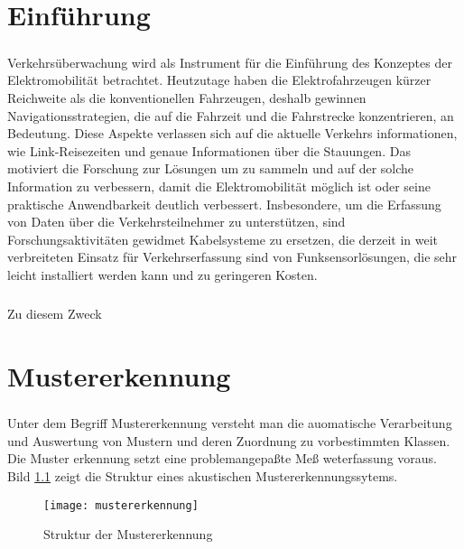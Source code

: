 \chapter*{Einf\"uhrung}

\paragraph{}
Verkehrs\"uberwachung wird als Instrument f\"ur die Einf\"uhrung des Konzeptes
der Elektromobilit\"at betrachtet. Heutzutage haben die Elektrofahrzeugen
k\"urzer Reichweite als die konventionellen Fahrzeugen, deshalb gewinnen
Navigationsstrategien, die auf die Fahrzeit und die Fahrstrecke konzentrieren,
an Bedeutung. Diese Aspekte verlassen sich auf die aktuelle Verkehrs%
informationen, wie Link-Reisezeiten und genaue Informationen \"uber die
Stauungen. Das motiviert die Forschung zur L\"osungen um zu sammeln und
auf der solche Information zu verbessern, damit die Elektromobilit\"at m\"oglich
ist oder seine praktische Anwendbarkeit deutlich verbessert. Insbesondere, um
die Erfassung von Daten \"uber die Verkehrsteilnehmer zu unterst\"utzen, sind
Forschungsaktivit\"aten gewidmet Kabelsysteme zu ersetzen, die derzeit in weit 
verbreiteten Einsatz für Verkehrserfassung sind von Funksensorl\"osungen, die 
sehr leicht installiert werden kann und zu geringeren Kosten.

\paragraph{}
Zu diesem Zweck \cite{sensor15}

\chapter{Mustererkennung}

\paragraph{}
Unter dem Begrif\mbox{}f Mustererkennung versteht man die auomatische
Verarbeitung und Auswertung von Mustern und deren Zuordnung zu vorbestimmten
Klassen. Die Muster erkennung setzt eine problemangepa\ss{}te Me\ss{}%
weterfassung voraus. Bild \ref{fig:mustererkennung} zeigt die Struktur eines
akustischen \cite{mekonnen92} Mustererkennungssytems.

\begin{figure}[ht]
\centering
\texttt{[image: mustererkennung]}
\caption{Struktur der Mustererkennung}
\label{fig:mustererkennung}
\end{figure}

